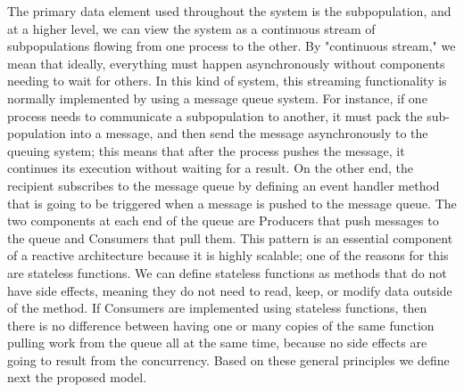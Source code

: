 \documentclass[review]{elsarticle}
\begin{document}
The primary data element used throughout the system is the subpopulation, and at a higher
level, we can view the system as a continuous stream of subpopulations
flowing
from one process to the other. By "continuous stream," we mean that ideally,
everything must happen asynchronously without components needing to wait for
others. In this kind of system, this streaming functionality is normally
implemented by using a message queue system. For instance, if one process needs
to communicate a subpopulation to another, it must pack the sub-population into
a message, and then send the message asynchronously %
to the queuing system; this
means that after the process pushes the message, it continues its execution
without waiting for a result. On the other end, the recipient subscribes to the
message queue by defining an event handler method that is going to be triggered when a
message is pushed to the message queue. The two components at each end of the queue are
Producers that push messages to the queue and Consumers that pull them. This
pattern is an essential component of a reactive architecture because it is
highly scalable; one of the reasons for this are stateless functions. We can
define stateless functions as methods that do not have side effects, meaning
they do not need to read, keep, or modify data outside of the method. If
Consumers are implemented using stateless functions, then there is no difference
between having one or many copies of the same function pulling work from the queue all at the
same time, because no side effects are going to result from the
concurrency.
Based on these general principles we define next the proposed model.
\end{document}
